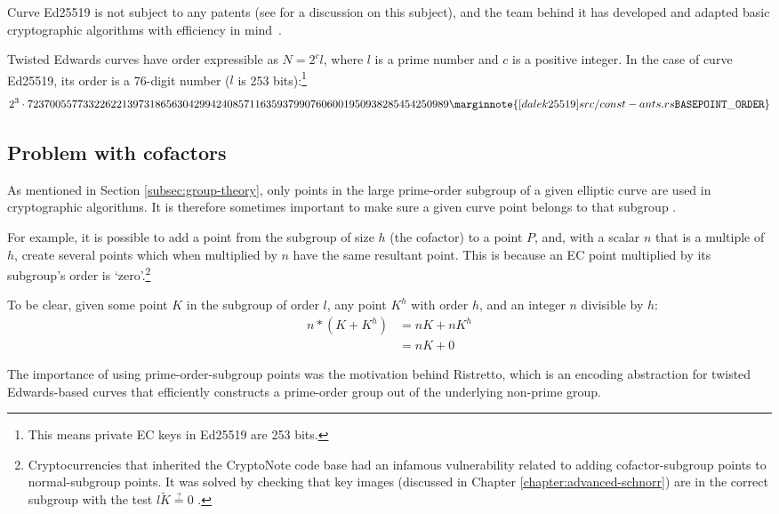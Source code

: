 Curve Ed25519 is not subject to any patents (see \cite{ECC-patents} for a discussion on this subject), and the team behind it has
developed and adapted basic cryptographic algorithms with efficiency in mind~\cite{Bernstein2007-faster-ec-ops}.

Twisted Edwards curves have order expressible as \(N=2^c l\), where \(l\) is a prime number and \(c\) is a positive integer. In the case of curve Ed25519, its order is a 76-digit number ($l$ is 253 bits):\footnote{This means private EC keys in Ed25519 are 253 bits.}\vspace{.175cm}
\[2^3 \cdot 7237005577332262213973186563042994240857116359379907606001950938285454250989\marginnote{[dalek25519] src/const- ants.rs {\tt BASEPOINT\_ ORDER}}\]


\subsection{Problem with cofactors}
\label{subsec:problem-cofactors}

As mentioned in Section \ref{subsec:group-theory}, only points in the large prime-order subgroup of a given elliptic curve are used in cryptographic algorithms. It is therefore sometimes important to make sure a given curve point belongs to that subgroup \cite{decaf}.

For example, it is possible to add a point from the subgroup of size $h$ (the cofactor) to a point $P$, and, with a scalar $n$ that is a multiple of $h$, create several points which when multiplied by $n$ have the same resultant point. This is because an EC point multiplied by its subgroup's order is `zero'.\footnote{Cryptocurrencies that inherited the CryptoNote code base had an infamous vulnerability related to adding cofactor-subgroup points to normal-subgroup points. It was solved by checking that key images (discussed in Chapter \ref{chapter:advanced-schnorr}) are in the correct subgroup with the test $l \tilde{K} \stackrel{?}{=} 0$ \cite{key-image-bug}.}

To be clear, given some point $K$ in the subgroup of order $l$, any point $K^h$ with order $h$, and an integer $n$ divisible by $h$:
\begin{align*}
    n*(K + K^h) &= n K + n K^h\\
                &= n K + 0
\end{align*}

The importance of using prime-order-subgroup points was the motivation behind Ristretto, which is an encoding abstraction for twisted Edwards-based curves that efficiently constructs a prime-order group out of the underlying non-prime group. \cite{ristretto-motivation}


